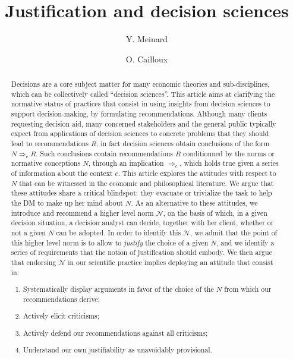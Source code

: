 \documentclass[preprint, french, english, 11pt, authoryear]{elsarticle}%
\newcommand{\adv}{\mathscr{N}}
\begin{document}
\hypersetup{citecolor=black}
\title{Justification and decision sciences}

\author[ld]{Y. Meinard}
\author[ld]{O. Cailloux}
\address[ld]{Universit\'e Paris-Dauphine, PSL Research University, CNRS, UMR [7243], LAMSADE, 75016 PARIS, FRANCE}

\begin{abstract}
Decisions are a core subject matter for many economic theories and sub-disciplines, which can be collectively called “decision sciences”. This article aims at clarifying the normative status of practices that consist in using insights from decision sciences to support decision-making, by formulating recommendations. Although many clients requesting decision aid, many concerned stakeholders and the general public typically expect from applications of decision sciences to concrete problems that they should lead to recommendations $R$, in fact decision sciences obtain conclusions of the form $N ⇒_c R$. Such conclusions contain recommendations $R$ conditionned by the norms or normative conceptions $N$, through  an implication $⇒_c$, which holds true given a series of information about the context $c$. This article explores the attitudes with respect to $N$ that can be witnessed in the economic and philosophical literature. We argue that these attitudes share a critical blindspot: they evacuate or trivialize the task to help the \ac{DM} to make up her mind about $N$. As an alternative to these attitudes, we introduce and recommend a higher level norm $\adv$, on the basis of which, in a given decision situation, a decision analyst can decide, together with her client, whether or not a given $N$ can be adopted. In order to identify this $\adv$, we admit that the point of this higher level norm is to allow to \emph{justify} the choice of a given $N$, and we identify a series of requirements that the notion of justification should embody. We then argue that endorsing $\adv$ in our scientific practice implies deploying an attitude that consist in:
\begin{enumerate}[label=\roman*.]
	\item Systematically display arguments in favor of the choice of the $N$ from which our recommendations derive;
	\item Actively elicit criticisms;
	\item Actively defend our recommendations against all criticisms;
	\item Understand our own justifiability as unavoidably provisional.
\end{enumerate}
\end{abstract}
\end{document}
